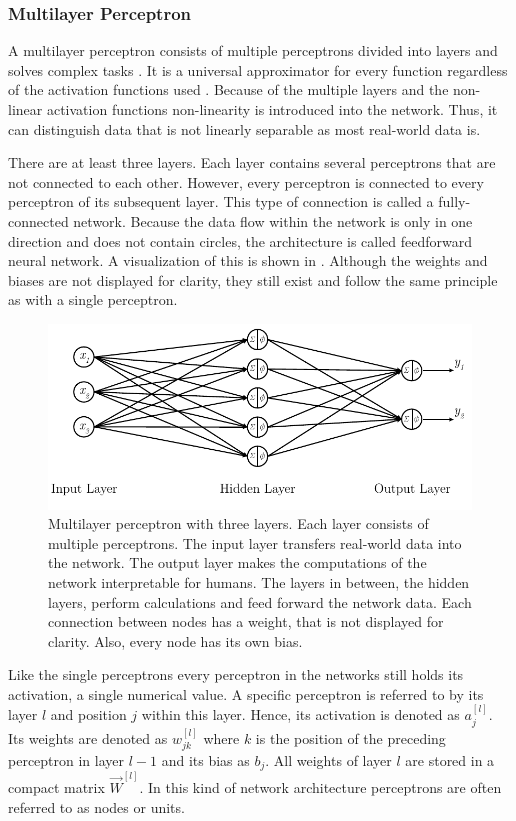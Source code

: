 \subsubsection{Multilayer Perceptron}
\label{sec:mlp-multilayer-perceptron}
A multilayer perceptron consists of multiple perceptrons divided into layers and solves complex tasks \cite{Bishop1995}.
It is a universal approximator for every function \cite{Cybenko1989} regardless of the activation functions used \cite{Hornik1991}.
Because of the multiple layers and the non-linear activation functions non-linearity is introduced into the network.
Thus, it can distinguish data that is not linearly separable as most real-world data is.

There are at least three layers.
Each layer contains several perceptrons that are not connected to each other.
However, every perceptron is connected to every perceptron of its subsequent layer.
This type of connection is called a fully-connected network.
Because the data flow within the network is only in one direction and does not contain circles, the architecture is called feedforward neural network.
A visualization of this is shown in .
Although the weights and biases are not displayed for clarity, they still exist and follow the same principle as with a single perceptron.
\begin{figure}
	\centering
	\includegraphics{images/multilayer-perceptron}
	\caption[Multilayer perceptron]{Multilayer perceptron with three layers. Each layer consists of multiple perceptrons. The input layer transfers real-world data into the network. The output layer makes the computations of the network interpretable for humans. The layers in between, the hidden layers, perform calculations and feed forward the network data. Each connection between nodes has a weight, that is not displayed for clarity. Also, every node has its own bias.}
	\label{fig:multilayer-perceptron}
\end{figure}
Like the single perceptrons every perceptron in the networks still holds its activation, a single numerical value.
A specific perceptron is referred to by its layer $l$ and position $j$ within this layer.
Hence, its activation is denoted as $a^{[l]}_{j}$.
Its weights are denoted as $w^{[l]}_{jk}$ where $k$ is the position of the preceding perceptron in layer $l-1$ and its bias as $b_j$.
All weights of layer $l$ are stored in a compact matrix $\vec{W}^{[l]}$.
In this kind of network architecture perceptrons are often referred to as nodes or units.

